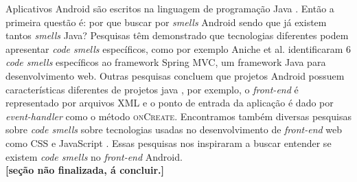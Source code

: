 Aplicativos Android s\~ao escritos na linguagem de programa\c{c}\~ao Java \cite{AndroidFundamentals}. Ent\~ao a primeira quest\~ao \'e: por que buscar por \textit{smells} Android sendo que j\'a existem tantos \textit{smells} Java? Pesquisas t\^em demonstrado que tecnologias diferentes podem apresentar \textit{code smells} espec\'ificos, como por exemplo Aniche et al. identificaram 6 \textit{code smells} espec\'ificos ao framework Spring MVC, um framework Java para desenvolvimento web. Outras pesquisas concluem que projetos Android possuem caracter\'isticas diferentes de projetos java \cite{Hecht2015, Mannan_Dig_Ahmed_Jensen_Abdullah_Almurshed, ReimannBrylski2013}, por exemplo, o \textit{front-end} \'e representado por arquivos XML e o ponto de entrada da aplica\c{c}\~ao \'e dado por \textit{event-handler} \cite{AndroidActivities2016} como o m\'etodo \textsc{onCreate}. Encontramos tamb\'em diversas pesquisas sobre \textit{code smells} sobre tecnologias usadas no desenvolvimento de \textit{front-end} web como CSS \cite{CSSCodeSmell} e JavaScript \cite{BB}. Essas pesquisas nos inspiraram a buscar entender se existem \textit{code smells} no \textit{front-end} Android. \\


\textbf{[se\c{c}\~ao n\~ao finalizada, \'a concluir.]}